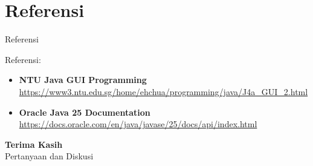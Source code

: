 \documentclass{beamer}
\begin{document}
\section{Referensi}
\begin{frame}{Referensi}
  \begin{block}{Referensi:}
    \begin{itemize}
      \item \textbf{NTU Java GUI Programming}\\
            \url{https://www3.ntu.edu.sg/home/ehchua/programming/java/J4a_GUI_2.html}
      \item \textbf{Oracle Java 25 Documentation}\\
            \url{https://docs.oracle.com/en/java/javase/25/docs/api/index.html}
    \end{itemize}
  \end{block}
\end{frame}

\begin{frame}[standout]
  \Huge \textbf{Terima Kasih} \\[1.5em]
  \Large Pertanyaan dan Diskusi
\end{frame}
\end{document}
